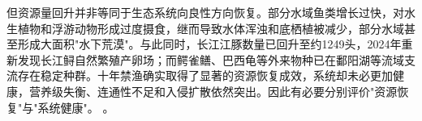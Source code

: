 但资源量回升并非等同于生态系统向良性方向恢复。部分水域鱼类增长过快，对水生植物和浮游动物形成过度摄食，继而导致水体浑浊和底栖植被减少，部分水域甚至形成大面积"水下荒漠"。与此同时，长江江豚数量已回升至约1249头，2024年重新发现长江鲟自然繁殖产卵场；而鳄雀鳝、巴西龟等外来物种已在鄱阳湖等流域支流存在稳定种群。十年禁渔确实取得了显著的资源恢复成效，系统却未必更加健康，营养级失衡、连通性不足和入侵扩散依然突出。因此有必要分别评价"资源恢复"与"系统健康"。
\cite{report2022,report2023}。
